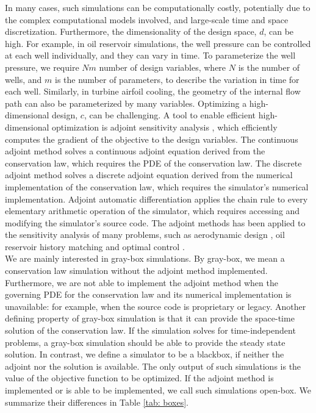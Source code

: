 \documentclass{paper1}
\begin{document}
In many cases, such simulations can be computationally costly, potentially 
due to the complex computational models involved, and
large-scale time and space discretization. Furthermore, 
the dimensionality of the design space, $d$, can be high. 
For example, in oil reservoir simulations, the well pressure can be controlled at each well
individually, and they can vary in time.
To parameterize the well pressure, we require $Nm$ number of design variables, where $N$ is the number of wells,
and $m$ is the number of parameters, to describe the variation in time for each well.
Similarly, in turbine airfoil cooling,
the geometry of the internal flow path can also be parameterized by many variables.
Optimizing a high-dimensional design, $c$,
can be challenging.
A tool to enable efficient high-dimensional optimization is adjoint sensitivity analysis
\cite{adjoint}
, which efficiently computes the gradient of the objective to the design variables. 
The continuous adjoint method solves 
a continuous adjoint equation derived from the conservation law, which 
requires the PDE of the conservation law.
The discrete adjoint method solves a discrete adjoint equation derived 
from the numerical implementation of the conservation law,
which requires the simulator's numerical implementation.
Adjoint automatic differentiation applies the chain rule to every elementary arithmetic operation of the simulator,
which requires accessing and modifying the simulator's source code.
The adjoint methods has been applied to the sensitivity analysis of many 
problems, such as aerodynamic design \cite{adjoint aerodynamics} , 
oil reservoir history matching \cite{adjoint history matching} and optimal control 
\cite{adjoint reservoir optimal control, adjoint well placement}.
\\


We are mainly interested in gray-box simulations. By gray-box, we mean a conservation law simulation
 without the adjoint method implemented. Furthermore, we are not able to implement the adjoint method
when the governing PDE for the conservation law and its numerical implementation is unavailable:
for example, when the source code is proprietary or legacy.
Another defining property of gray-box simulation is that it can provide the space-time solution of the conservation law.
If the simulation solves for time-independent problems, a gray-box simulation should be able to 
provide the steady state solution.
In contrast, we define a simulator to be a blackbox, if neither the adjoint nor the solution is available.
The only output of such simulations is the value of the objective function to be optimized.
If the adjoint method is implemented or is able to be implemented,
we call such simulations open-box.
We summarize their differences in Table \ref{tab: boxes}.\\
\end{document}

